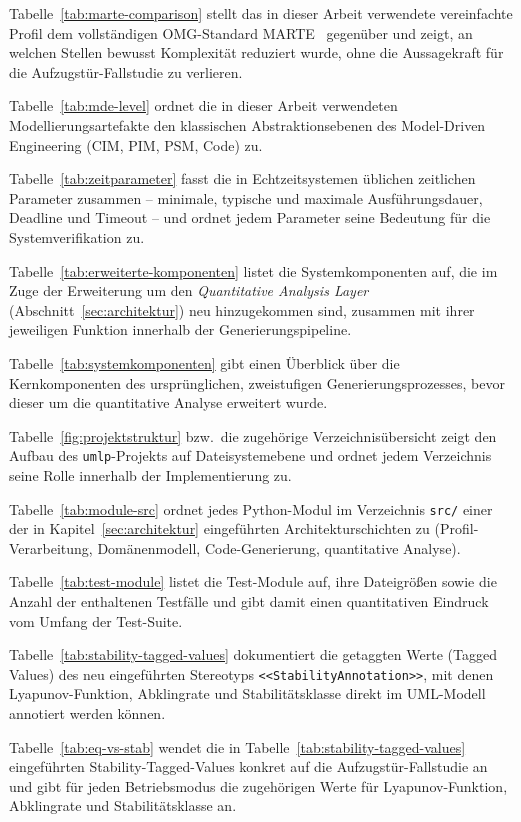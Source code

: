 ﻿\documentclass[a4paper,12pt]{report}
\theoremstyle{definition}
\begin{document}
Tabelle~\ref{tab:marte-comparison} stellt das in dieser Arbeit verwendete vereinfachte Profil dem vollständigen OMG-Standard MARTE~\cite{marte} gegenüber und zeigt, an welchen Stellen bewusst Komplexität reduziert wurde, ohne die Aussagekraft für die Aufzugstür-Fallstudie zu verlieren.

Tabelle~\ref{tab:mde-level} ordnet die in dieser Arbeit verwendeten Modellierungsartefakte den klassischen Abstraktionsebenen des Model-Driven Engineering (CIM, PIM, PSM, Code) zu.

Tabelle~\ref{tab:zeitparameter} fasst die in Echtzeitsystemen üblichen zeitlichen Parameter zusammen -- minimale, typische und maximale Ausführungsdauer, Deadline und Timeout -- und ordnet jedem Parameter seine Bedeutung für die Systemverifikation zu.

Tabelle~\ref{tab:erweiterte-komponenten} listet die Systemkomponenten auf, die im Zuge der Erweiterung um den \textit{Quantitative Analysis Layer} (Abschnitt~\ref{sec:architektur}) neu hinzugekommen sind, zusammen mit ihrer jeweiligen Funktion innerhalb der Generierungspipeline.

Tabelle~\ref{tab:systemkomponenten} gibt einen Überblick über die Kernkomponenten des ursprünglichen, zweistufigen Generierungsprozesses, bevor dieser um die quantitative Analyse erweitert wurde.

Tabelle~\ref{fig:projektstruktur} bzw.\ die zugehörige Verzeichnisübersicht zeigt den Aufbau des \texttt{umlp}-Projekts auf Dateisystemebene und ordnet jedem Verzeichnis seine Rolle innerhalb der Implementierung zu.

Tabelle~\ref{tab:module-src} ordnet jedes Python-Modul im Verzeichnis \texttt{src/} einer der in Kapitel~\ref{sec:architektur} eingeführten Architekturschichten zu (Profil-Verarbeitung, Domänenmodell, Code-Generierung, quantitative Analyse).

Tabelle~\ref{tab:test-module} listet die Test-Module auf, ihre Dateigrößen sowie die Anzahl der enthaltenen Testfälle und gibt damit einen quantitativen Eindruck vom Umfang der Test-Suite.

Tabelle~\ref{tab:stability-tagged-values} dokumentiert die getaggten Werte (Tagged Values) des neu eingeführten Stereotyps \texttt{<<StabilityAnnotation>>}, mit denen Lyapunov-Funktion, Abklingrate und Stabilitätsklasse direkt im UML-Modell annotiert werden können.

Tabelle~\ref{tab:eq-vs-stab} wendet die in Tabelle~\ref{tab:stability-tagged-values} eingeführten Stability-Tagged-Values konkret auf die Aufzugstür-Fallstudie an und gibt für jeden Betriebsmodus die zugehörigen Werte für Lyapunov-Funktion, Abklingrate und Stabilitätsklasse an.
\end{document}
